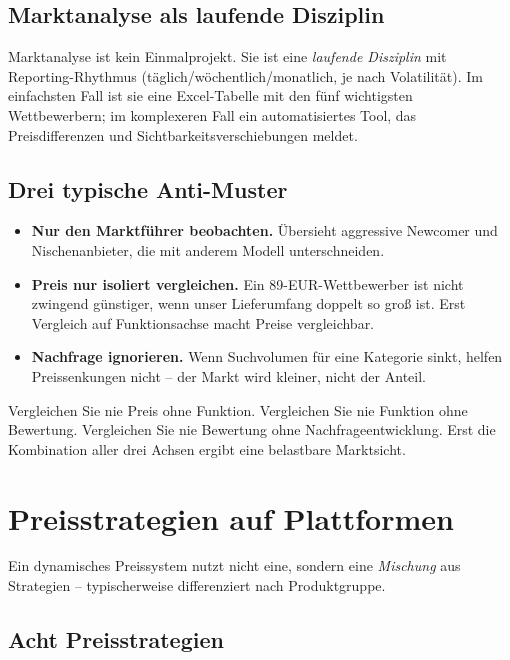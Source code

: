 \documentclass[11pt,a4paper,oneside]{article}
\begin{document}
\subsection{Marktanalyse als laufende Disziplin}

Marktanalyse ist kein Einmalprojekt. Sie ist eine \emph{laufende Disziplin} mit Reporting-Rhythmus (täglich/wöchentlich/monatlich, je nach Volatilität). Im einfachsten Fall ist sie eine Excel-Tabelle mit den fünf wichtigsten Wettbewerbern; im komplexeren Fall ein automatisiertes Tool, das Preisdifferenzen und Sichtbarkeitsverschiebungen meldet.

\subsection{Drei typische Anti-Muster}

\begin{itemize}
  \item \textbf{Nur den Marktführer beobachten.} Übersieht aggressive Newcomer und Nischenanbieter, die mit anderem Modell unterschneiden.
  \item \textbf{Preis nur isoliert vergleichen.} Ein 89-EUR-Wettbewerber ist nicht zwingend günstiger, wenn unser Lieferumfang doppelt so groß ist. Erst Vergleich auf Funktionsachse macht Preise vergleichbar.
  \item \textbf{Nachfrage ignorieren.} Wenn Suchvolumen für eine Kategorie sinkt, helfen Preissenkungen nicht -- der Markt wird kleiner, nicht der Anteil.
\end{itemize}

\begin{merkbox}
Vergleichen Sie nie Preis ohne Funktion. Vergleichen Sie nie Funktion ohne Bewertung. Vergleichen Sie nie Bewertung ohne Nachfrageentwicklung. Erst die Kombination aller drei Achsen ergibt eine belastbare Marktsicht.
\end{merkbox}

\section{Preisstrategien auf Plattformen}

Ein dynamisches Preissystem nutzt nicht eine, sondern eine \emph{Mischung} aus Strategien -- typischerweise differenziert nach Produktgruppe.

\subsection{Acht Preisstrategien}
\end{document}
